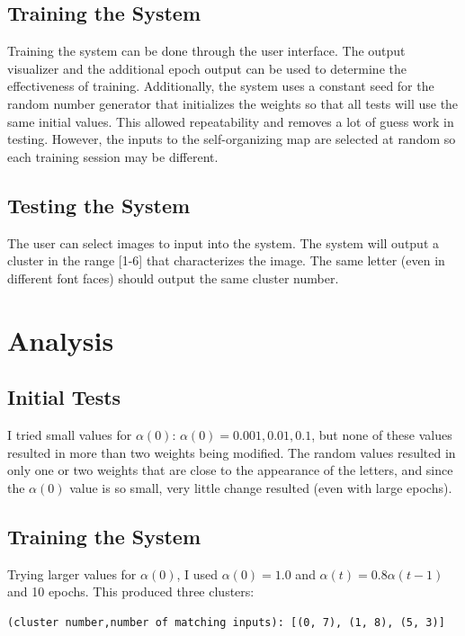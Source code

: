 \documentclass[12pt,letterpaper,oneside]{report}
\begin{document}
\subsection{Training the System}
Training the system can be done through the user interface. The output visualizer and the additional epoch output can be used to determine the effectiveness of training. Additionally, the system uses a constant seed for the random number generator that initializes the weights so that all tests will use the same initial values. This allowed repeatability and removes a lot of guess work in testing. However, the inputs to the self-organizing map are selected at random so each training session may be different.

\subsection{Testing the System}
The user can select images to input into the system. The system will output a cluster in the range [1-6] that characterizes the image. The same letter (even in different font faces) should output the same cluster number.

\clearpage
\section{Analysis}


\subsection{Initial Tests}
I tried small values for $\alpha(0)$: $\alpha(0) = 0.001, 0.01, 0.1$, but none of these values resulted in more than two weights being modified. The random values resulted in only one or two weights that are close to the appearance of the letters, and since the $\alpha(0)$ value is so small, very little change resulted (even with large epochs).

\subsection{Training the System}
Trying larger values for $\alpha(0)$, I used $\alpha(0) = 1.0$ and $\alpha(t) = 0.8\alpha(t-1)$ and 10 epochs. This produced three clusters: 
\begin{verbatim}
(cluster number,number of matching inputs): [(0, 7), (1, 8), (5, 3)]
\end{verbatim}
\end{document}
